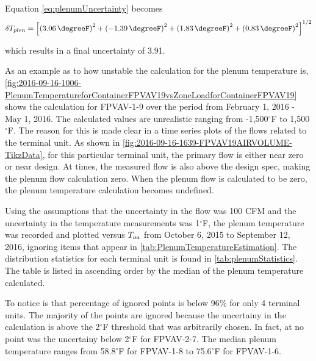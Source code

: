 Equation \ref{eq:plenumUncertainty} becomes
\begin{equation}\label{eq:plenumUncertainty}
    \delta T_{plen} = \left[\left(  \SI{3.06}{\degreeF}  \right)^2  +\left( \SI{-1.39}{\degreeF}  \right)^2 +  \left( \SI{1.83}{\degreeF} \right)^2 + \left(\SI{0.83}{\degreeF}  \right)^2  \right]^{1/2}
\end{equation}

which results in a final uncertainty of \SI{3.91}{\degreeF}.

As an example as to how unstable the calculation for the plenum temperature is, \figref{} \ref{fig:2016-09-16-1006-PlenumTemperatureforContainerFPVAV19vsZoneLoadforContainerFPVAV19} shows the calculation for FPVAV-1-9 over the period from February 1, 2016 - May 1, 2016. The calculated values are unrealistic ranging from -1,500\(^\circ\)F to 1,500\(^\circ\)F. The reason for this is made clear in a time series plots of the flows related to the terminal unit. As shown in \figref{} \ref{fig:2016-09-16-1639-FPVAV19AIRVOLUME-TikzData}, for this particular terminal unit, the primary flow is either near zero or near design. At times, the measured flow is also above the design spec, making the plenum flow calculation zero. When the plenum flow is calculated to be zero, the plenum temperature calculation becomes undefined.


Using the assumptions that the uncertainty in the flow was 100 CFM and the uncertainty in the temperature measurements was 1\(^\circ\)F, the plenum temperature was recorded and plotted versus \(T_{oa}\) from October 6, 2015 to September 12, 2016, ignoring items that appear in \tableref{} \ref{tab:PlenumTemperatureEstimation}. The distribution statistics for each terminal unit is found in \tableref{} \ref{tab:plenumStatistics}. The table is listed in ascending order by the median of the plenum temperature calculated.

To notice is that percentage of ignored points is below 96\% for only 4 terminal units. The majority of the points are ignored because the uncertainy in the calculation is above the 2\(^\circ\)F threshold that was arbitrarily chosen. In fact, at no point was the uncertainy below 2\(^\circ\)F for FPVAV-2-7. The median plenum temperature ranges from 58.8\(^\circ\)F for FPVAV-1-8 to 75.6\(^\circ\)F for FPVAV-1-6.


